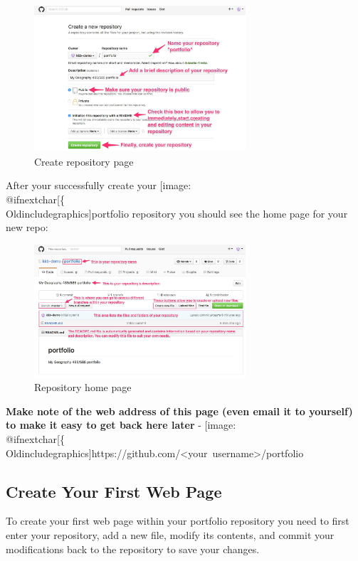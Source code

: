 \documentclass[]{book}
\makeatletter
\def\ScaleIfNeeded{%
  \ifdim\Gin@nat@width>.5\linewidth
    .5\linewidth
  \else
    \Gin@nat@width
  \fi
}
\let\Oldincludegraphics\texttt{[image: \%
 \\catcode`\\@=11\\relax\%
 \%\\gdef\\includegraphics\{\\@ifnextchar[\{\\Oldincludegraphics]}{\Oldincludegraphics[width=\ScaleIfNeeded]}}%
\gdef\texttt{[image: \\@ifnextchar[\{\\Oldincludegraphics]}{\Oldincludegraphics[max size={.75\textwidth}{.75\textheight}]}}%
\makeatother
\begin{document}
\begin{figure}[htbp]
\centering
\includegraphics[width=0.70000\textwidth]{images/github_createRepo.jpg}
\caption{Create repository page}
\end{figure}

After your successfully create your \texttt{portfolio} repository you
should see the home page for your new repo:

\begin{figure}[htbp]
\centering
\includegraphics[width=0.70000\textwidth]{images/github_portfolioHome.jpg}
\caption{Repository home page}
\end{figure}

\textbf{Make note of the web address of this page (even email it to
yourself) to make it easy to get back here later} -
\texttt{https://github.com/\textless{}your\ username\textgreater{}/portfolio}

\subsection{Create Your First Web
Page}\label{create-your-first-web-page}

To create your first web page within your portfolio repository you need
to first enter your repository, add a new file, modify its contents, and
commit your modifications back to the repository to save your changes.
\end{document}
